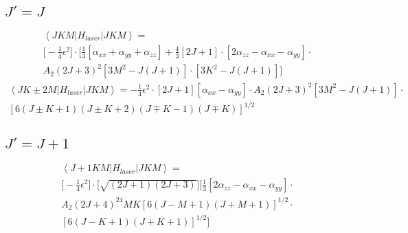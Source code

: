 \documentclass{article}
\newcommand{\ket}[1]{\left |{#1}\right \rangle}
\newcommand{\bra}[1]{\left \langle {#1}\right |}
\begin{document}
\subsection{$J'=J$}

\begin{align*}
  \bra{JKM}H_{laser}\ket{JKM}=\\\bigg[-\frac{1}{4}\epsilon^2\bigg]\cdot\bigg[\frac{1}{3}[\alpha_{xx}+\alpha_{yy}+\alpha_{zz}]+\frac{4}{3}[2J+1]\cdot[2\alpha_{zz}-\alpha_{xx}-\alpha_{yy}]\cdot\\A_2(2J+3)^2[3M^2-J(J+1)]\cdot[3K^2-J(J+1)]\bigg]
\end{align*}
\begin{align*}
  \bra{JK\pm 2M}H_{laser}\ket{JKM}=-\frac{1}{4}\epsilon^2\cdot [2J+1] [\alpha_{xx}-\alpha_{yy}]\cdot A_2(2J+3)^2[3M^2-J(J+1)]\cdot\\ [6(J\pm K+1)(J \pm K+2)(J \mp K-1)(J \mp K)]^{1/2}
\end{align*}
\subsection{$J'=J+1$}
\begin{align*}
  \bra{J+1KM}H_{laser}\ket{JKM}=\\\bigg[-\frac{1}{4}\epsilon^2\bigg]\cdot \bigg[ \sqrt{(2J+1)(2J+3)}\bigg] \bigg[\frac{1}{3}[2\alpha_{zz}-\alpha_{xx}-\alpha_{yy}]\cdot\\A_2(2J+4)^24MK [6(J-M+1)(J+M+1)]^{1/2}\cdot\\ [6(J-K+1)(J+K+1)]^{1/2}\bigg]
\end{align*}
\end{document}
